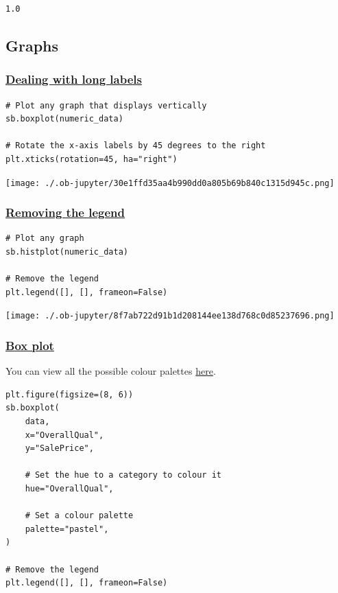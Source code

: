\documentclass[11pt]{article}
\begin{document}
\label{org7a628c8}
\begin{verbatim}
1.0
\end{verbatim}
\subsection{Graphs}
\label{sec:orgd6697fe}

\subsubsection{\href{https://matplotlib.org/stable/api/\_as\_gen/matplotlib.pyplot.xticks.html}{Dealing with long labels}}
\label{sec:org9cf9d27}
\begin{verbatim}
# Plot any graph that displays vertically
sb.boxplot(numeric_data)

# Rotate the x-axis labels by 45 degrees to the right
plt.xticks(rotation=45, ha="right")
\end{verbatim}

\begin{center}
\texttt{[image: ./.ob-jupyter/30e1ffd35aa4b990dd0a805b69b840c1315d945c.png]}
\label{org69db075}
\end{center}

 \newpage
\subsubsection{\href{https://matplotlib.org/stable/api/\_as\_gen/matplotlib.pyplot.legend.html}{Removing the legend}}
\label{sec:orgcbd278e}
\begin{verbatim}
# Plot any graph
sb.histplot(numeric_data)

# Remove the legend
plt.legend([], [], frameon=False)
\end{verbatim}

\begin{center}
\texttt{[image: ./.ob-jupyter/8f7ab722d91b1d208144ee138d768c0d85237696.png]}
\label{org13cfda8}
\end{center}

 \newpage
\subsubsection{\href{https://seaborn.pydata.org/generated/seaborn.boxplot.html}{Box plot}}
\label{sec:org1a381ed}
You can view all the possible colour palettes \href{https://seaborn.pydata.org/tutorial/color\_palettes.html\#qualitative-color-palettes}{here}.
\begin{verbatim}
plt.figure(figsize=(8, 6))
sb.boxplot(
    data,
    x="OverallQual",
    y="SalePrice",

    # Set the hue to a category to colour it
    hue="OverallQual",

    # Set a colour palette
    palette="pastel",
)

# Remove the legend
plt.legend([], [], frameon=False)
\end{verbatim}
\end{document}

